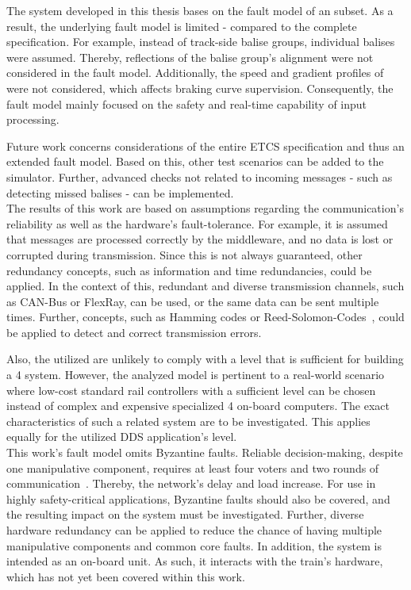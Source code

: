 The system developed in this thesis bases on the fault model of an  subset.
As a result, the underlying fault model is limited - compared to the complete  specification.
For example, instead of track-side balise groups, individual balises were assumed.
Thereby, reflections of the balise group's alignment were not considered in the fault model.
Additionally, the speed and gradient profiles of  were not considered, which affects braking curve supervision.
Consequently, the fault model mainly focused on the safety and real-time capability of input processing.

Future work concerns considerations of the entire ETCS specification and thus an extended fault model.
Based on this, other test scenarios can be added to the simulator.
Further, advanced checks not related to incoming messages - such as detecting missed balises - can be implemented.
\\

\noindent
The results of this work are based on assumptions regarding the communication's reliability as well as the hardware's fault-tolerance.
For example, it is assumed that messages are processed correctly by the middleware, and no data is lost or corrupted during transmission.
Since this is not always guaranteed, other redundancy concepts, such as information and time redundancies, could be applied.
In the context of this, redundant and diverse transmission channels, such as CAN-Bus or FlexRay, can be used, or the same data can be sent multiple times.
Further,  concepts, such as Hamming codes or Reed-Solomon-Codes~\cite{ReedSolomonCodes}, could be applied to detect and correct transmission errors.

Also, the utilized  are unlikely to comply with a  level that is sufficient for building a  4 system.
However, the analyzed model is pertinent to a real-world scenario where low-cost standard rail controllers with a sufficient  level can be chosen instead of complex and expensive specialized  4 on-board computers.
The exact characteristics of such a related system are to be investigated.
This applies equally for the utilized DDS application's  level.
\\

\noindent
This work's fault model omits Byzantine faults.
Reliable decision-making, despite one manipulative component, requires at least four voters and two rounds of communication~\cite{GamerIncreasingMOON}.
Thereby, the network's delay and load increase.
For use in highly safety-critical applications, Byzantine faults should also be covered, and the resulting impact on the system must be investigated.
Further, diverse hardware redundancy can be applied to reduce the chance of having multiple manipulative components and common core faults.
In addition, the system is intended as an  on-board unit.
As such, it interacts with the train's hardware, which has not yet been covered within this work.

